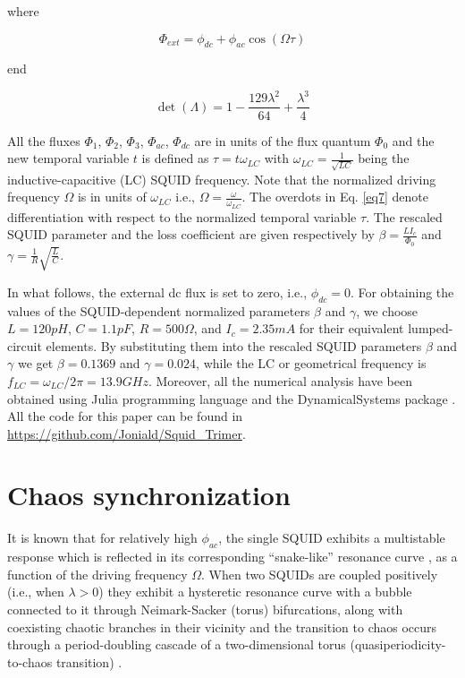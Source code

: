 \documentclass[aps,pre,reprint,groupedaddress]{revtex4-1}
\begin{document}
where

\begin{equation} \label{eq8}
\varPhi_{ext} = \phi_{dc} + \phi_{ac} \cos (\Omega \tau)
\end{equation}

end

\begin{equation} \label{eq9}
\det(\Lambda) = 1 - \frac{129 \lambda^{2}}{64} +\frac{\lambda^{3}}{4}
\end{equation}

All the fluxes $\Phi_{1}$,  $\Phi_{2}$,  $\Phi_{3}$,  $\Phi_{ac}$,  $\Phi_{dc}$ are in units of the flux quantum  $\Phi_{0}$ and the new temporal variable $t$ is defined as
$\tau = t \omega_{LC}$ with $\omega_{LC} = \frac{1}{\sqrt{LC}} $ being the inductive-capacitive
(LC) SQUID frequency.  Note that the normalized driving frequency
$\Omega$ is in units of $\omega_{LC}$ i.e., $\Omega = \frac{\omega}{\omega_{LC}}$. The overdots in 
Eq. \ref{eq7} denote differentiation with respect to the normalized temporal variable $\tau$. The rescaled SQUID parameter and the loss coefficient are given respectively by $\beta = \frac{LI_{c}}{\Phi_{0}}$ and $\gamma = \frac{1}{R} \sqrt{ \frac{L}{C} }$. 

In what follows, the external dc flux is set to zero, i.e., $\phi_{dc} = 0 $. For obtaining the values of the SQUID-dependent normalized parameters $\beta$ and $\gamma$, we choose $L = 120 pH$, $C = 1.1 pF$, $R = 500 \Omega $, and $I_{c} = 2.35 mA$ for their equivalent lumped-circuit elements. By substituting them into
the rescaled SQUID parameters $\beta$ and $\gamma$ we get $ \beta = 0.1369$ and $\gamma = 0.024$, while the LC or geometrical frequency is $f_{LC} = \omega_{LC} / 2 \pi = 13.9 GHz $. Moreover, all the numerical analysis have been obtained using Julia programming language and the DynamicalSystems package \cite{Datseris2018}. All the code for this paper can be found in \url{https://github.com/Joniald/Squid_Trimer}.

\section{Chaos synchronization}

It is known that for relatively high $\phi_{ac}$, the single SQUID
exhibits a multistable response which is reflected in its corresponding
“snake-like” resonance curve \cite{Hizanidis2018}, as a function of the driving frequency $\Omega$. When two SQUIDs are coupled positively (i.e., when $\lambda > 0$) they exhibit a hysteretic resonance curve with a bubble connected to it through Neimark-Sacker (torus) bifurcations, along with coexisting chaotic branches in their vicinity and the transition to chaos occurs through a period-doubling cascade of a two-dimensional torus (quasiperiodicity-to-chaos transition) \cite{Shena2020}. 
\end{document}
